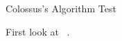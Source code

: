 \documentclass[a4paper,10pt]{article}
\begin{document}
\begin{center}
Colossus's Algorithm Test 
\end{center}

First look at ~\cite{THOMAS}.


\end{document}
